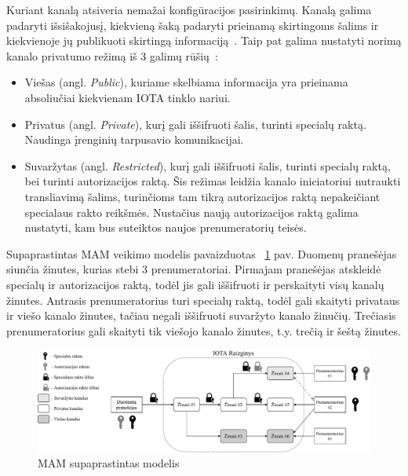 Kuriant kanalą atsiveria nemažai konfigūracijos pasirinkimų. Kanalą galima padaryti išsišakojusį, kiekvieną šaką padaryti prieinamą skirtingoms šalims ir kiekvienoje jų publikuoti skirtingą informaciją~\cite{ab2018iota}. Taip pat galima nustatyti norimą kanalo privatumo režimą iš 3 galimų rūšių~\cite{paul2017introducing}:
\begin{itemize}
    \item Viešas (angl. \textit{Public}), kuriame skelbiama informacija yra prieinama absoliučiai kiekvienam IOTA tinklo nariui.
    \item Privatus (angl. \textit{Private}), kurį gali iššifruoti šalis, turinti specialų raktą. Naudinga įrenginių tarpusavio komunikacijai.
    \item Suvaržytas (angl. \textit{Restricted}), kurį gali iššifruoti šalis, turinti specialų raktą, bei turinti autorizacijos raktą. Šis režimas leidžia kanalo iniciatoriui nutraukti transliavimą šalims, turinčioms tam tikrą autorizacijos raktą nepakeičiant specialaus rakto reikšmės. Nustačius naują autorizacijos raktą galima nustatyti, kam bus suteiktos naujos prenumeratorių teisės.
\end{itemize}

Supaprastintas MAM veikimo modelis pavaizduotas ~\ref{img:9} pav. Duomenų pranešėjas siunčia žinutes, kurias stebi 3 prenumeratoriai. Pirmajam pranešėjas atskleidė specialų ir autorizacijos raktą, todėl jis gali iššifruoti ir perskaityti visų kanalų žinutes. Antrasis prenumeratorius turi specialų raktą, todėl gali skaityti privataus ir viešo kanalo žinutes, tačiau negali iššifruoti suvaržyto kanalo žinučių. Trečiasis prenumeratorius gali skaityti tik viešojo kanalo žinutes, t.y. trečią ir šeštą žinutes.

\begin{figure}[H]
    \centering
    \includegraphics[scale=0.51]{images/mam-example}
    \caption{MAM supaprastintas modelis}
    \label{img:9}
\end{figure}




